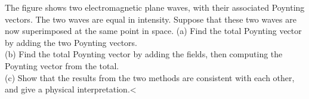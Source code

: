 The figure shows two electromagnetic plane waves, with their associated Poynting vectors.
The two waves are equal in intensity.
Suppose that these two waves are now superimposed at the same point in space.
(a) Find the total Poynting vector by adding the two Poynting vectors.\\
(b) Find the total Poynting vector by adding the fields, then computing the
Poynting vector from the total.\\
(c) Show that the results from the two methods are consistent with each other,
and give a physical interpretation.<%
